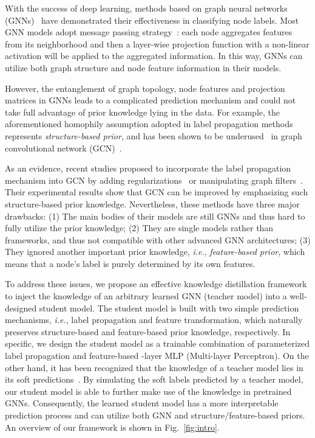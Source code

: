 \documentclass[sigconf]{acmart}
\begin{document}
With the success of deep learning, methods based on graph neural networks (GNNs)~\cite{kipf2016semi,velivckovic2018graph,hamilton2017inductive} have demonstrated their effectiveness in classifying node labels. Most GNN models adopt message passing strategy~\cite{gilmer2017neural}: each node aggregates features from its neighborhood and then a layer-wise projection function with a non-linear activation will be applied to the aggregated information. In this way, GNNs can utilize both graph structure and node feature information in their models.

However, the entanglement of graph topology, node features and projection matrices in GNNs leads to a complicated prediction mechanism and could not take full advantage of prior knowledge lying in the data. For example, the aforementioned homophily assumption adopted in label propagation methods represents \textit{structure-based prior}, and has been shown to be underused~\cite{li2019label,wang2020unifying} in graph convolutional network (GCN)~\cite{kipf2016semi}.

As an evidence, recent studies proposed to incorporate the label propagation mechanism into GCN by adding regularizations~\cite{wang2020unifying} or manipulating graph filters~\cite{li2019label,shi2020masked}. Their experimental results show that GCN can be improved by emphasizing such structure-based prior knowledge. Nevertheless, these methods have three major drawbacks: (1) The main bodies of their models are still GNNs and thus hard to fully utilize the prior knowledge; (2) They are single models rather than frameworks, and thus not compatible with other advanced GNN architectures; (3) They ignored another important prior knowledge, \textit{i.e.}, \textit{feature-based prior}, which means that a node's label is purely determined by its own features.

To address these issues, we propose an effective knowledge distillation framework to inject the knowledge of an arbitrary learned GNN (teacher model) into a well-designed student model. The student model is built with two simple prediction mechanisms, \textit{i.e.}, label propagation and feature transformation, which naturally preserves structure-based and feature-based prior knowledge, respectively. In specific, we design the student model as a trainable combination of parameterized label propagation and feature-based -layer MLP (Multi-layer Perceptron). On the other hand, it has been recognized that the knowledge of a teacher model lies in its soft predictions~\cite{hinton2015distilling}. By simulating the soft labels predicted by a teacher model, our student model is able to further make use of the knowledge in pretrained GNNs. Consequently, the learned student model has a more interpretable prediction process and can utilize both GNN and structure/feature-based priors. An overview of our framework is shown in Fig.~\ref{fig:intro}. 
\end{document}
